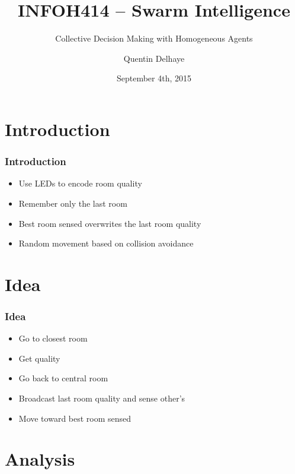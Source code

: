 \documentclass[xcolor={x11names, rgb, usenames, dvipsnames}]{beamer}
\author{Quentin Delhaye}
\title[INFOH414 -- Swarm Intelligence]{INFOH414 -- Swarm Intelligence}
\subtitle{Collective Decision Making with Homogeneous Agents}
\institute[ULB]{Université Libre de Bruxelles}
\date{September 4th, 2015}
\begin{document}
\begin{frame}
\titlepage
\end{frame}

\begin{frame}
	\tableofcontents
\end{frame}


\section{Introduction}

\begin{frame}
\frametitle{Introduction}
\begin{itemize}
	\item Use LEDs to encode room quality
	\item Remember only the last room
	\item Best room sensed overwrites the last room quality
	\item Random movement based on collision avoidance
\end{itemize}
\end{frame}



\section{Idea}

\begin{frame}
\frametitle{Idea}
\begin{itemize}
	\item Go to closest room
	\item Get quality
	\item Go back to central room
	\item Broadcast last room quality and sense other's
	\item Move toward best room sensed
\end{itemize}
\end{frame}



\section{Analysis}
\end{document}
